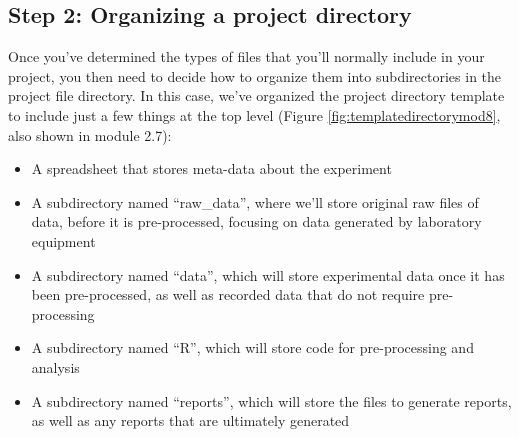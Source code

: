 \documentclass[]{tufte-book}
\providecommand{\tightlist}{%
  \setlength{\itemsep}{0pt}\setlength{\parskip}{0pt}}
\begin{document}
\subsection{Step 2: Organizing a project directory}\label{step-2-organizing-a-project-directory}

Once you've determined the types of files that you'll normally include in your
project, you then need to decide how to organize them into subdirectories in the
project file directory. In this case, we've organized the project directory
template to include just a few things at the top level (Figure
\ref{fig:templatedirectorymod8}, also shown in module 2.7):

\begin{itemize}
\tightlist
\item
  A spreadsheet that stores meta-data about the experiment
\item
  A subdirectory named ``raw\_data'', where we'll store original raw files of
  data, before it is pre-processed, focusing on data generated by laboratory
  equipment
\item
  A subdirectory named ``data'', which will store experimental data once it
  has been pre-processed, as well as recorded data that do not require pre-processing
\item
  A subdirectory named ``R'', which will store code for pre-processing and analysis
\item
  A subdirectory named ``reports'', which will store the files to generate
  reports, as well as any reports that are ultimately generated
\end{itemize}
\end{document}
